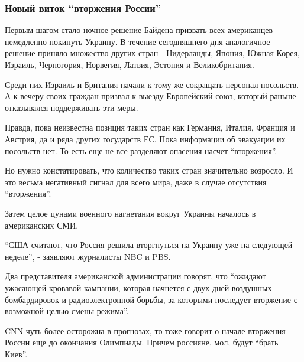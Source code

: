  
 
 
 
 

\subsubsection{Новый виток \enquote{вторжения России}}
\label{sec:12_02_2022.stz.news.ua.strana.1.vojna_nachnetsja_15_fevralja.1.novyj_vitok}

Первым шагом стало ночное решение Байдена призвать всех американцев немедленно
покинуть Украину. В течение сегодняшнего дня аналогичное решение приняло
множество других стран -  Нидерланды, Япония, Южная Корея, Израиль, Черногория,
Норвегия, Латвия, Эстония и Великобритания.

Среди них Израиль и Британия начали к тому же сокращать персонал посольств. А к
вечеру своих граждан призвал к выезду Европейский союз, который раньше
отказывался поддерживать эти меры.

Правда, пока неизвестна позиция таких стран как Германия, Италия, Франция и
Австрия, да и ряда других государств ЕС. Пока информации об эвакуации их
посольств нет. То есть еще не все разделяют опасения насчет \enquote{вторжения}.

Но нужно констатировать, что количество таких стран значительно возросло. И это
весьма негативный сигнал для всего мира, даже в случае отсутствия \enquote{вторжения}. 

Затем целое цунами военного нагнетания вокруг Украины началось в американских
СМИ.

\enquote{США считают, что Россия решила вторгнуться на Украину уже на следующей
неделе}, - заявляют журналисты NBC и PBS.

Два представителя американской администрации говорят, что \enquote{ожидают ужасающей
кровавой кампании, которая начнется с двух дней воздушных бомбардировок и
радиоэлектронной борьбы, за которыми последует вторжение с возможной целью
смены режима}.

CNN чуть более осторожна в прогнозах, то тоже говорит о начале вторжения России
еще до окончания Олимпиады. Причем россияне, мол, будут \enquote{брать Киев}. 

